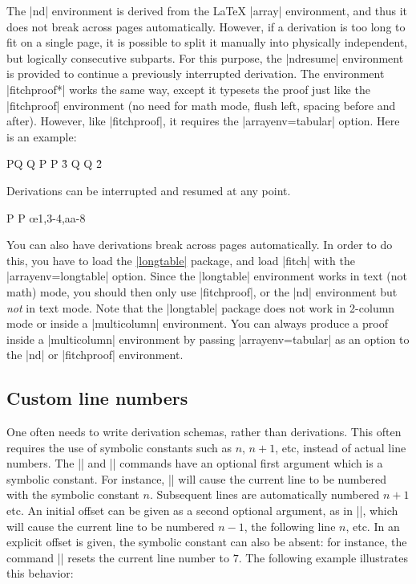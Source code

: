 \documentclass{ltxdoc}
\newcommand\NewIn[1]{\leavevmode
  \marginpar{\hfill\fbox{\fbox{New in #1}}\hspace*{1em}}\ignorespaces}
\begin{document}
The |nd| environment is derived from the {\LaTeX} |array|
environment, and thus it does not break across pages automatically. 
However, if a derivation is too long to fit on a single page, it is
possible to split it manually into physically independent, but
logically consecutive subparts. For this purpose, the |ndresume|
environment is provided to continue a previously interrupted
derivation. 
\NewIn{1.0} The environment |fitchproof*| works the same way, except
it typesets the
proof just like the |fitchproof| environment (no need for math mode,
flush left, spacing before and after). However, like |fitchproof|, it
requires the |arrayenv=tabular| option. Here is an example:

\begin{LTXexample}
\begin{fitchproof}
    {P\vee Q}
    {\neg Q}
  \open
   {P}
   {P}      \r{3}
  \close
  \open
   {Q}
   {\neg Q} \r{2}
\end{fitchproof}
Derivations can be interrupted and 
resumed at any point.
\begin{fitchproof*}
   {\bot}  
   {P}     
  \close
   {P}     \oe{1,3-4,aa-8}
\end{fitchproof*}
\end{LTXexample}

\NewIn{1.0} You can also have derivations break across pages
automatically. In order to do this, you have to load the
\href{https://ctan.org/pkg/longtable}{|longtable|} package, and load
|fitch| with the |arrayenv=longtable| option. Since the |longtable|
environment works in text (not math) mode, you should then only use
|fitchproof|, or the |nd| environment but \emph{not} in text mode.
Note that the |longtable| package does not work in 2-column mode or
inside a |multicolumn| environment. You can always produce a proof
inside a |multicolumn| environment by passing |arrayenv=tabular| as an
option to the |nd| or |fitchproof| environment.


\subsection{Custom line numbers}\label{subsec-customline}

One often needs to write derivation schemas, rather than derivations.
This often requires the use of symbolic constants such as $n$, $n+1$,
etc, instead of actual line numbers. The |\have| and |\hypo|
commands have an optional first argument which is a symbolic constant.
For instance, |\have[n]| will cause the current line to be
numbered with the symbolic constant $n$. Subsequent lines are
automatically numbered $n+1$ etc. An initial offset can be given as a
second optional argument, as in |\have[n][-1]|, which will cause
the current line to be numbered $n-1$, the following line $n$, etc. In
an explicit offset is given, the symbolic constant can also be absent:
for instance, the command |\have[][7]| resets the current line
number to $7$. The following example illustrates this behavior:
\end{document}
